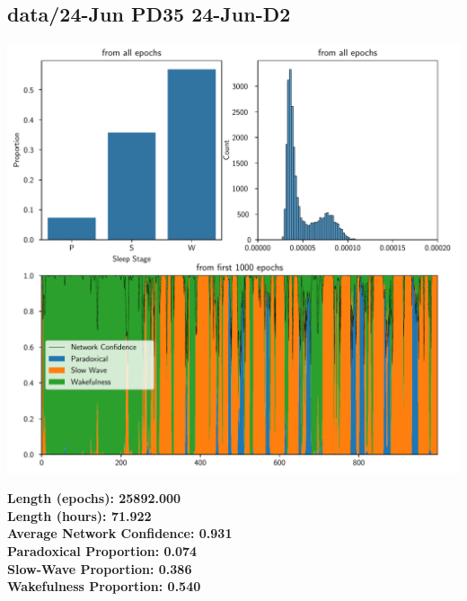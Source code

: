         \subsection*{ data/24-Jun PD35 24-Jun-D2 }
        \begin{center}
        \begin{adjustbox}{width=1\textwidth}
        \includegraphics[page=18]{figs.pdf}
        \end{adjustbox}
        \end{center}
        \large\textbf{Length (epochs): 25892.000}\\
        \textbf{Length (hours): 71.922}\\
        \textbf{Average Network Confidence: 0.931}\\
        \textbf{Paradoxical Proportion: 0.074}\\
        \textbf{Slow-Wave Proportion: 0.386}\\
        \textbf{Wakefulness Proportion: 0.540}\\
        
